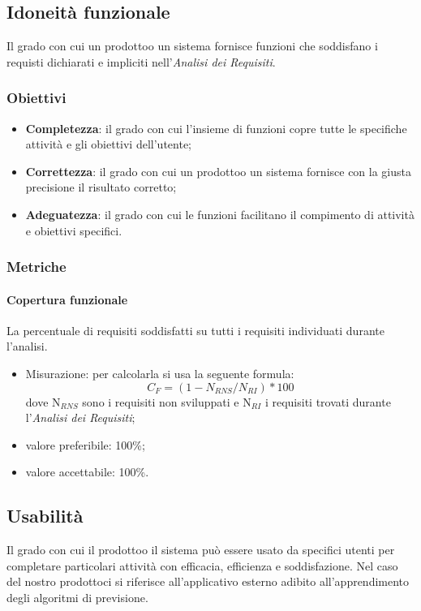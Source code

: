     \subsection{Idoneità funzionale}
        Il grado con cui un prodotto\glosp o un sistema fornisce funzioni che soddisfano i requisti dichiarati e impliciti nell'\textit{Analisi dei Requisiti}.
        \subsubsection{Obiettivi}
            \begin{itemize}
                \item \textbf{Completezza}: il grado con cui l'insieme di funzioni copre tutte le specifiche attività e gli obiettivi dell'utente;
                \item \textbf{Correttezza}: il grado con cui un prodotto\glosp o un sistema fornisce con la giusta precisione il risultato corretto;
                \item \textbf{Adeguatezza}: il grado con cui le funzioni facilitano il compimento di attività e obiettivi specifici.
            \end{itemize}
        \subsubsection{Metriche}
            \paragraph{Copertura funzionale}
                La percentuale di requisiti soddisfatti su tutti i requisiti individuati durante l'analisi.
                \begin{itemize}
                    \item Misurazione: per calcolarla si usa la seguente formula: 
                    \[C_F=(1-N_{RNS}/N_{RI})*100\]
                    dove N$_{RNS}$ sono i requisiti non sviluppati e N$_{RI}$ i requisiti trovati durante l'\textit{Analisi dei Requisiti};
                    \item valore preferibile: 100\%;
                    \item valore accettabile: 100\%.
                \end{itemize}
    \subsection{Usabilità}
        Il grado con cui il prodotto\glosp o il sistema può essere usato da specifici utenti per completare particolari attività con efficacia, efficienza e soddisfazione. Nel caso del nostro prodotto\glosp ci si riferisce all'applicativo esterno adibito all'apprendimento degli algoritmi di previsione.

